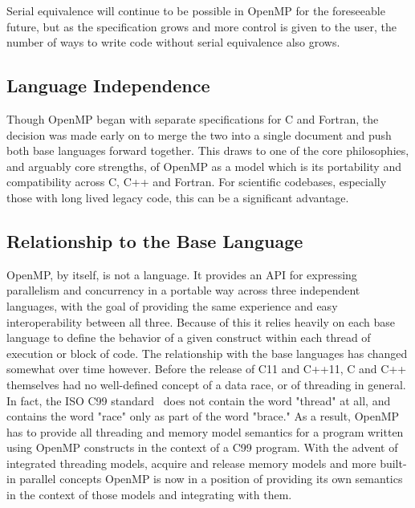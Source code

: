Serial equivalence will continue to be possible in OpenMP for the foreseeable
future, but as the specification grows and more control is given to the user,
the number of ways to write code without serial equivalence also grows.

\subsection{Language Independence}
\label{sub:language_independence}

Though OpenMP began with separate specifications for C and Fortran, the decision
was made early on to merge the two into a single document and push both base
languages forward together.  This draws to one of the core philosophies, and
arguably core strengths, of OpenMP as a model which is its portability and
compatibility across C, C++ and Fortran.  For scientific codebases, especially
those with long lived legacy code, this can be a significant advantage.  


\subsection{Relationship to the Base Language}
\label{sub:relationship_to_the_base_language}

OpenMP, by itself, is not a language.  It provides an API for expressing
parallelism and concurrency in a portable way across three independent
languages, with the goal of providing the same experience and easy
interoperability between all three.  Because of this it relies heavily on each
base language to define the behavior of a given construct within each thread of
execution or block of code.  The relationship with the base languages has
changed somewhat over time however.  Before the release of C11 and C++11, C and
C++ themselves had no well-defined concept of a data race, or of threading in
general.  In fact, the ISO C99 standard~\cite{c99} does not contain the word
"thread" at all, and contains the word "race" only as part of the word "brace."
As a result, OpenMP has to provide all threading and memory model semantics for
a program written using OpenMP constructs in the context of a C99 program.  With
the advent of integrated threading models, acquire and release memory models and
more built-in parallel concepts OpenMP is now in a position of providing its own
semantics in the context of those models and integrating with them.



